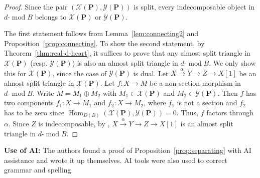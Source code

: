 \documentclass[11pt,a4paper,reqno]{amsart}
\theoremstyle{plain}
\numberwithin{equation}{section}
\theoremstyle{definition}
\renewcommand{\mod}{\operatorname{mod}}
\newcommand{\Hom}{\operatorname{Hom}}
\newcommand{\emod}[2]{#1\text{-}\!\mod #2}
\newcommand{\PP}{\mathbf{P}}
\newcommand{\X}{\mathcal{X}}
\newcommand{\Y}{\mathcal{Y}}
\begin{document}
\begin{proof}
  Since the pair $(\X(\PP),\Y(\PP))$ is split, every indecomposable object in $\emod{d}{B}$ belongs to $\X(\PP)$ or $\Y(\PP)$.

  The first statement follows from Lemma~\ref{lem:connecting2} and Proposition~\ref{prop:connecting}. To show the second statement, by Theorem~\ref{thm:real-d-heart}, it suffices to prove that any almost split triangle in $\X(\PP)$ (resp. $\Y(\PP)$) is also an almost split triangle in $\emod{d}{B}$. We only show this for $\X(\PP)$, since the case of $\Y(\PP)$ is dual. Let $X\xrightarrow{\alpha} Y\to Z\to X[1]$ be an almost split triangle in $\X(\PP)$. Let $f\colon X\to M$ be a non-section morphism in $\emod{d}{B}$. Write $M=M_1\oplus M_2$ with $M_1\in\X(\PP)$ and $M_2\in \Y(\PP)$. Then $f$ has two components $f_1\colon X\to M_1$ and $f_2\colon X\to M_2$, where $f_1$ is not a section and $f_2$ has to be zero since $\Hom_{D(B)}(\X(\PP),\Y(\PP))=0$. Thus, $f$ factors through $\alpha$. Since $Z$ is indecomposable, by \cite[Theorem~2.9]{INP}, $X\xrightarrow{\alpha} Y\to Z\to X[1]$ is an almost split triangle in $\emod{d}{B}$.
\end{proof}

\bigskip

\noindent \textbf{Use of AI:}
The authors found a proof of Proposition~\ref{prop:separating} with AI assistance and wrote it up themselves. AI tools were also used to correct grammar and spelling.
\end{document}
